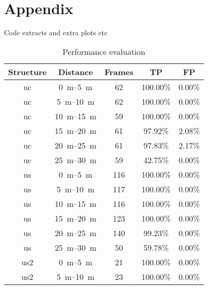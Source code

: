 \chapter{Appendix}
\label{ch:Appendix}

Code extracts and extra plots etc
\begin{table}[htbp]
    \centering
    \caption{Performance evaluation}
    \label{tab:full_evaluation}
    \begin{tabular}[t]{ccccc}
        \toprule
        \textbf{Structure} & \textbf{Distance}        & \textbf{Frames} & \textbf{TP} & \textbf{FP} \\
        \midrule
        uc                 & \SIrange{0}{5}{\metre}   & 62              & 100.00\%    & 0.00\%      \\
        uc                 & \SIrange{5}{10}{\metre}  & 62              & 100.00\%    & 0.00\%      \\
        uc                 & \SIrange{10}{15}{\metre} & 59              & 100.00\%    & 0.00\%      \\
        uc                 & \SIrange{15}{20}{\metre} & 61              & 97.92\%     & 2.08\%      \\
        uc                 & \SIrange{20}{25}{\metre} & 61              & 97.83\%     & 2.17\%      \\
        uc                 & \SIrange{25}{30}{\metre} & 59              & 42.75\%     & 0.00\%      \\
        us                 & \SIrange{0}{5}{\metre}   & 116             & 100.00\%    & 0.00\%      \\
        us                 & \SIrange{5}{10}{\metre}  & 117             & 100.00\%    & 0.00\%      \\
        us                 & \SIrange{10}{15}{\metre} & 116             & 100.00\%    & 0.00\%      \\
        us                 & \SIrange{15}{20}{\metre} & 123             & 100.00\%    & 0.00\%      \\
        us                 & \SIrange{20}{25}{\metre} & 140             & 99.23\%     & 0.00\%      \\
        us                 & \SIrange{25}{30}{\metre} & 50              & 59.78\%     & 0.00\%      \\
        us2                & \SIrange{0}{5}{\metre}   & 21              & 100.00\%    & 0.00\%      \\
        us2                & \SIrange{5}{10}{\metre}  & 23              & 100.00\%    & 0.00\%      \\

\end{tabular}
\end{table}
